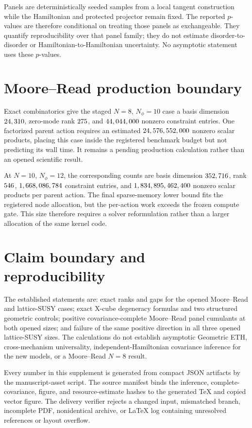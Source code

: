 \documentclass[aps,prb,onecolumn,superscriptaddress,longbibliography,floatfix]{revtex4-2}
\begin{document}
Panels are deterministically seeded samples from a local tangent construction while the Hamiltonian and protected projector remain fixed. The reported \(p\)-values are therefore conditional on treating those panels as exchangeable. They quantify reproducibility over that panel family; they do not estimate disorder-to-disorder or Hamiltonian-to-Hamiltonian uncertainty. No asymptotic statement uses these \(p\)-values.

\section{Moore--Read production boundary}
\label{app:resources}

Exact combinatorics give the staged \(N=8\), \(N_\phi=10\) case a basis dimension \(24,310\), zero-mode rank \(275\), and \(44,044,000\) nonzero constraint entries. One factorized parent action requires an estimated \(24,576,552,000\) nonzero scalar products, placing this case inside the registered benchmark budget but not predicting its wall time. It remains a pending production calculation rather than an opened scientific result.

At \(N=10\), \(N_\phi=12\), the corresponding counts are basis dimension \(352,716\), rank \(546\), \(1,668,086,784\) constraint entries, and \(1,834,895,462,400\) nonzero scalar products per parent action. The final sparse-memory lower bound fits the registered node allocation, but the per-action work exceeds the frozen compute gate. This size therefore requires a solver reformulation rather than a larger allocation of the same kernel code.

\section{Claim boundary and reproducibility}
\label{app:claims}

The established statements are: exact ranks and gaps for the opened Moore--Read and lattice-SUSY cases; exact X-cube degeneracy formulas and two structured geometric controls; positive covariance-complete Moore--Read panel cumulants at both opened sizes; and failure of the same positive direction in all three opened lattice-SUSY sizes. The calculations do not establish asymptotic Geometric ETH, cross-mechanism universality, independent-Hamiltonian covariance inference for the new models, or a Moore--Read \(N=8\) result.

Every number in this supplement is generated from compact JSON artifacts by the manuscript-asset script. The source manifest binds the inference, complete-covariance, figure, and resource-estimate hashes to the generated TeX and copied vector figure. The delivery verifier rejects a changed input, mismatched branch, incomplete PDF, nonidentical archive, or LaTeX log containing unresolved references or layout overflow.


\end{document}
